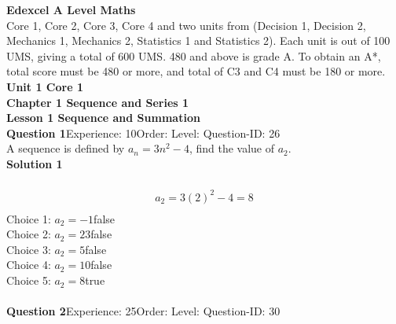 \documentclass{article}
\begin{document}
\noindent\Huge{\textbf{Edexcel A Level Maths}}\\[5pt]
\noindent\large{Core 1, Core 2, Core 3, Core 4 and two units from (Decision 1, Decision 2, Mechanics 1, Mechanics 2, Statistics 1 and Statistics 2).  Each unit is out of 100 UMS, giving a total of 600 UMS.  480 and above is grade A.  To obtain an A*, total score must be 480 or more, and total of C3 and C4 must be 180 or more.}\\[20pt]
\noindent\huge{\textbf{Unit 1 Core 1}}\\[18pt]
\noindent\huge{\textbf{Chapter 1 Sequence and Series 1}}\\[15pt]
\noindent\large{\textbf{Lesson 1 Sequence and Summation}}\\[12pt]
\noindent\textbf{Question 1}\hspace{20pt}Experience: 10\hspace{20pt}Order: \hspace{20pt}Level: \hspace{20pt}Question-ID: 26\\[2pt]
A sequence is defined by $a_n=3n^2-4$, find the value of $a_2$.\\[4pt]
\noindent\textbf{Solution 1}\\[2pt]
\\[-35pt]\begin{align*}
a_2=3(2)^2-4=8\\[2pt]
\end{align*}
Choice 1: \hspace{20pt}$a_2=-1$\hspace{20pt}false\\
Choice 2: \hspace{20pt}$a_2=23$\hspace{20pt}false\\
Choice 3: \hspace{20pt}$a_2=5$\hspace{20pt}false\\
Choice 4: \hspace{20pt}$a_2=10$\hspace{20pt}false\\
Choice 5: \hspace{20pt}$a_2=8$\hspace{20pt}true\\
\\[4pt]
\noindent\textbf{Question 2}\hspace{20pt}Experience: 25\hspace{20pt}Order: \hspace{20pt}Level: \hspace{20pt}Question-ID: 30\\[2pt]
\end{document}
